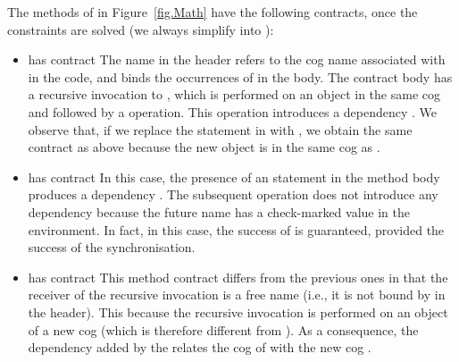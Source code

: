 \begin{example}
The methods of  in Figure~\ref{fig.Math}
  have the following contracts, once the constraints are solved (we
  always simplify  into ):
  \begin{itemize}
  \item {} has contract 
  {\footnotesize}
The name  in the header refers to the cog name associated
    with \this{} in the code, and binds the occurrences of  in
    the body.  The contract body has a recursive invocation to
    , which is performed on an object in the same cog
     and followed by a  operation.  This operation
    introduces a dependency  . We observe that, if we
    replace the statement  in
     with  , we obtain the same contract as above because
    the new object is in the same cog as .

\medskip

  \item {} has contract
    {\footnotesize} In this case, the presence of an
     statement in the method body produces a dependency
   . The subsequent  operation does
    not introduce any dependency  because the future name has a 
    check-marked value in the environment. In fact, in
    this case, the success of  is guaranteed, provided the
    success of the  synchronisation.
    
\medskip

  \item {} has contract
    {\footnotesize} This method contract differs from the
    previous ones in that the receiver of the recursive invocation is
    a free name (i.e., it is not bound by  in the header).  This
    because the recursive invocation is performed on an object of a
    new cog (which is therefore different from ). As a
    consequence, the dependency  added by the  relates
    the cog  of  with the new cog .
  \end{itemize}
\end{example}


